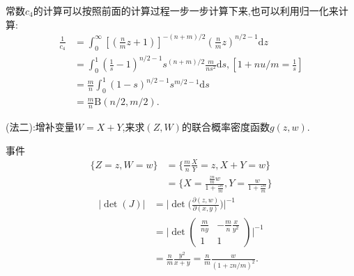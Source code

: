	\begin{frame}
		常数$c_4$的计算可以按照前面的计算过程一步一步计算下来,也可以利用归一化来计算:
		\begin{equation}
			\begin{split}
				\frac{1}{c_4} &= \int_{0}^{\infty}[(\frac{n}{m}z+1)]^{-(n+m)/2} (\frac{n}{m}z)^{n/2-1}\mathrm{d}z \\
				&=\int_{0}^{1} (\frac{1}{s}-1)^{n/2-1}s^{(n+m)/2}\frac{m}{ns^2}\mathrm{d}s,[1+nu/m=\frac{1}{s}] \\
				&=\frac{m}{n}\int_{0}^{1}(1-s)^{n/2-1}s^{m/2-1}\mathrm{d}s \\
				&=\frac{m}{n}\mathrm{B}(n/2,m/2).
			\end{split}
		\end{equation}
	
	\end{frame}

	\begin{frame}
		(法二):增补变量$W = X+Y$,来求$(Z,W)$的联合概率密度函数$g(z,w)$.
		
		事件\begin{equation}
			\begin{split}
				\{Z=z,W=w\} &= \{\frac{m}{n}\frac{X}{Y}=z,X+Y=w \} \\
				 &= \{ X=\frac{\frac{zn}{m}w}{1+\frac{zn}{m}}, Y =\frac{w}{1+\frac{zn}{m}} \}
			\end{split}
		\end{equation}
		\begin{equation}
			\begin{split}
				|\det(J)| &= \bigg| \det\bigg(\frac{\partial(z,w)}{\partial(x,y)}\bigg) \bigg|^{-1} \\
				&=\bigg| \det \begin{pmatrix} \frac{m}{ny} & -\frac{m}{n}\frac{x}{y^2} \\ 1 & 1 \end{pmatrix}\bigg|^{-1} \\
				&= \frac{n}{m}\frac{y^2}{x+y} = \frac{n}{m}\frac{w}{(1+zn/m)^2}.
			\end{split}
		\end{equation}
	\end{frame}

